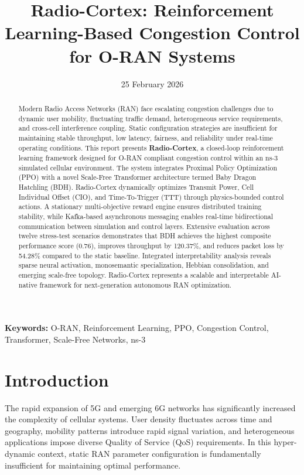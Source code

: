 \documentclass[12pt,a4paper]{article}
\title{
\textbf{Radio-Cortex: Reinforcement Learning-Based Congestion Control for O-RAN Systems}
}
\author{}
\date{25 February 2026}
\begin{document}
\maketitle
\thispagestyle{empty}

\begin{abstract}
Modern Radio Access Networks (RAN) face escalating congestion challenges due to dynamic user mobility, fluctuating traffic demand, heterogeneous service requirements, and cross-cell interference coupling. Static configuration strategies are insufficient for maintaining stable throughput, low latency, fairness, and reliability under real-time operating conditions. This report presents \textbf{Radio-Cortex}, a closed-loop reinforcement learning framework designed for O-RAN compliant congestion control within an ns-3 simulated cellular environment. The system integrates Proximal Policy Optimization (PPO) with a novel Scale-Free Transformer architecture termed Baby Dragon Hatchling (BDH). Radio-Cortex dynamically optimizes Transmit Power, Cell Individual Offset (CIO), and Time-To-Trigger (TTT) through physics-bounded control actions. A stationary multi-objective reward engine ensures distributed training stability, while Kafka-based asynchronous messaging enables real-time bidirectional communication between simulation and control layers. Extensive evaluation across twelve stress-test scenarios demonstrates that BDH achieves the highest composite performance score (0.76), improves throughput by 120.37\%, and reduces packet loss by 54.28\% compared to the static baseline. Integrated interpretability analysis reveals sparse neural activation, monosemantic specialization, Hebbian consolidation, and emerging scale-free topology. Radio-Cortex represents a scalable and interpretable AI-native framework for next-generation autonomous RAN optimization.
\end{abstract}

\noindent \textbf{Keywords:} O-RAN, Reinforcement Learning, PPO, Congestion Control, Transformer, Scale-Free Networks, ns-3

\newpage
\tableofcontents
\newpage

\section{Introduction}

The rapid expansion of 5G and emerging 6G networks has significantly increased the complexity of cellular systems. User density fluctuates across time and geography, mobility patterns introduce rapid signal variation, and heterogeneous applications impose diverse Quality of Service (QoS) requirements. In this hyper-dynamic context, static RAN parameter configuration is fundamentally insufficient for maintaining optimal performance.
\end{document}

